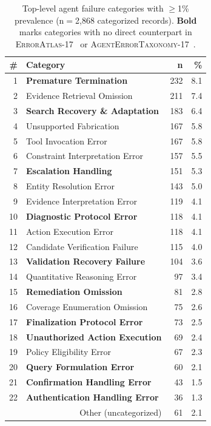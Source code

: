 \begin{table}[h]
\centering\small
\caption{Top-level agent failure categories with $\geq$1\%
prevalence (n$=$2{,}868 categorized records). \textbf{Bold} marks
categories with no direct counterpart in
\textsc{ErrorAtlas}-17~\cite{ashury2026errormap} or
\textsc{AgentErrorTaxonomy}-17~\cite{liu2025agentdebug}.}
\label{tab:agentic-prevalence}
\begin{tabular}{rlrr}
\toprule
\# & Category & n & \% \\
\midrule
1 & \textbf{Premature Termination}        & 232 & 8.1 \\
2 & Evidence Retrieval Omission           & 211 & 7.4 \\
3 & \textbf{Search Recovery \& Adaptation}& 183 & 6.4 \\
4 & Unsupported Fabrication               & 167 & 5.8 \\
5 & Tool Invocation Error                 & 167 & 5.8 \\
6 & Constraint Interpretation Error       & 157 & 5.5 \\
7 & \textbf{Escalation Handling}          & 151 & 5.3 \\
8 & Entity Resolution Error               & 143 & 5.0 \\
9 & Evidence Interpretation Error         & 119 & 4.1 \\
10 & \textbf{Diagnostic Protocol Error}    & 118 & 4.1 \\
11 & Action Execution Error                & 118 & 4.1 \\
12 & Candidate Verification Failure        & 115 & 4.0 \\
13 & \textbf{Validation Recovery Failure}  & 104 & 3.6 \\
14 & Quantitative Reasoning Error          & 97  & 3.4 \\
15 & \textbf{Remediation Omission}         & 81  & 2.8 \\
16 & Coverage Enumeration Omission         & 75  & 2.6 \\
17 & \textbf{Finalization Protocol Error}  & 73  & 2.5 \\
18 & \textbf{Unauthorized Action Execution}& 69  & 2.4 \\
19 & Policy Eligibility Error              & 67  & 2.3 \\
20 & \textbf{Query Formulation Error}      & 60  & 2.1 \\
21 & \textbf{Confirmation Handling Error}  & 43  & 1.5 \\
22 & \textbf{Authentication Handling Error}& 36  & 1.3 \\
\midrule
\multicolumn{2}{r}{Other (uncategorized)}  & 61  & 2.1 \\
\bottomrule
\end{tabular}
\end{table}

